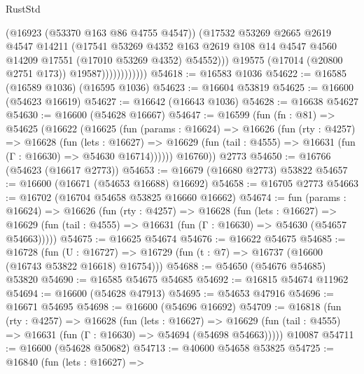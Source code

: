\begin{lexlean}{RustStd}
\begin{coremodule}
{\begin{coremodule}
{{{{{{{{{{{{{{{{{{{{{{{{{{{{{{{{{{{{{{{{{{{{{{{{{{{{{{{                              (@16923 (@53370 @163 @86 @4755 @4547))
                              (@17532
                                @53269
                                @2665
                                @2619
                                @4547
                                @14211
                                (@17541
                                  @53269
                                  @4352
                                  @163
                                  @2619
                                  @108
                                  @14
                                  @4547
                                  @4560
                                  @14209
                                  @17551
                                  (@17010 @53269 @4352)
                                  @54552)))
                            @19575
                            (@17014 (@20800 @2751 @173))
                            @19587))))))))))))
@54618 := @16583 @1036
@54622 := @16585 (@16589 @1036) (@16595 @1036)
@54623 := @16604 @53819
@54625 := @16600 (@54623 @16619)
@54627 := @16642 (@16643 @1036)
@54628 := @16638 @54627
@54630 := @16600 (@54628 @16667)
@54647 := @16599
    (fun (fn : @81) =>
    @54625
      (@16622
        (@16625
          (fun (params : @16624) =>
          @16626
            (fun (rty : @4257) =>
            @16628
              (fun (lets : @16627) =>
              @16629 (fun (tail : @4555) => @16631 (fun (Γ : @16630) => @54630 @16714))))))
        @16760))
    @2773
@54650 := @16766 (@54623 (@16617 @2773))
@54653 := @16679 (@16680 @2773) @53822
@54657 := @16600 (@16671 (@54653 @16688) @16692)
@54658 := @16705 @2773
@54663 := @16702 (@16704 @54658 @53825 @16660 @16662)
@54674 := fun (params : @16624) =>
  @16626
    (fun (rty : @4257) =>
    @16628
      (fun (lets : @16627) =>
      @16629 (fun (tail : @4555) => @16631 (fun (Γ : @16630) => @54630 (@54657 @54663)))))
@54675 := @16625 @54674
@54676 := @16622 @54675
@54685 := @16728
    (fun (U : @16727) => @16729 (fun (t : @7) => @16737 (@16600 (@16743 @53822 @16618) @16754)))
@54688 := @54650 (@54676 @54685) @53820
@54690 := @16585 @54675 @54685
@54692 := @16815 @54674 @11962
@54694 := @16600 (@54628 @47913)
@54695 := @54653 @47916
@54696 := @16671 @54695
@54698 := @16600 (@54696 @16692)
@54709 := @16818
    (fun (rty : @4257) =>
    @16628
      (fun (lets : @16627) =>
      @16629 (fun (tail : @4555) => @16631 (fun (Γ : @16630) => @54694 (@54698 @54663)))))
    @10087
@54711 := @16600 (@54628 @50682)
@54713 := @40600 @54658 @53825
@54725 := @16840
    (fun (lets : @16627) =>
}}}}}}}}}}}}}}}}}}}}}}}}}}}}}}}}}}}}}}}}}}}}}}}}}}}}}}}
\end{coremodule}}
\end{coremodule}
\end{lexlean}
